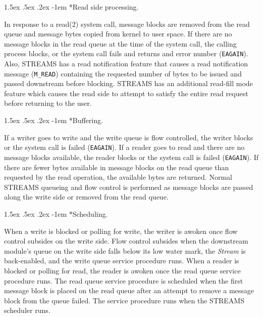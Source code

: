 \documentclass[letterpaper,final,notitlepage,twocolumn,10pt,twoside]{article}
\makeatletter
\renewcommand\paragraph{\@startsection{paragraph}{4}{\z@}%
                                    {1.5ex \@plus .5ex \@minus .2ex}%
                                    {-1em}%
                                    {\normalfont\normalsize\bfseries\slshape}}
\makeatother
\begin{document}
\paragraph*{Read side processing.}

In response to a read(2) system call, message blocks are removed from the read queue and message
bytes copied from kernel to user space.  If there are no message blocks in the read queue at the
time of the system call, the calling process blocks, or the system call fails and returns and error
number (\texttt{EAGAIN}).  Also, STREAMS has a read notification feature that causes a read
notification message (\texttt{M\_READ}) containing the requested number of bytes to be issued  and
passed downstream before blocking.  STREAMS has an additional read-fill mode feature which causes
the read side to attempt to satisfy the entire read request before returning to the user.

\paragraph*{Buffering.}

If a writer goes to write and the write queue is flow controlled, the writer blocks or the system
call is failed (\texttt{EAGAIN}).  If a reader goes to read and there are no message blocks
available, the reader blocks or the system call is failed (\texttt{EAGAIN}).  If there are fewer
bytes available in message blocks on the read queue than requested by the read operation, the
available bytes are returned.  Normal STREAMS queueing and flow control is performed as message
blocks are passed along the write side or removed from the read queue.

\paragraph*{Scheduling.}

When a write is blocked or polling for write, the writer is awoken once flow control subsides on the
write side.  Flow control subsides when the downstream module's queue on the write side falls below
its low water mark, the \textit{Stream} is back-enabled, and the write queue service procedure runs.
When a reader is blocked or polling for read, the reader is awoken once the read queue service
procedure runs.  The read queue service procedure is scheduled when the first message block is
placed on the read queue after an attempt to remove a message block from the queue failed.  The
service procedure runs when the STREAMS scheduler runs.
\end{document}
